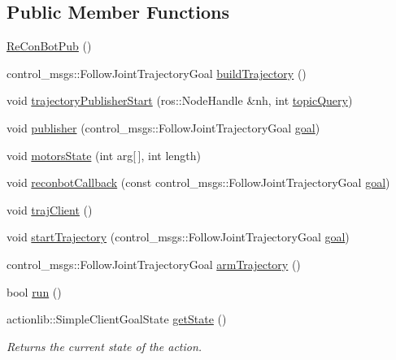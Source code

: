 \subsection*{Public Member Functions}
\begin{DoxyCompactItemize}
\item 
\hyperlink{class_re_con_bot_pub_a3e761c430b2934ad96e499dcd8bd67e2}{Re\+Con\+Bot\+Pub} ()
\item 
control\+\_\+msgs\+::\+Follow\+Joint\+Trajectory\+Goal \hyperlink{class_re_con_bot_pub_af99f5189cd8e834d7b59f1b106b99345}{build\+Trajectory} ()
\item 
void \hyperlink{class_re_con_bot_pub_a2019b0d8d30f2419026c90dd30de500f}{trajectory\+Publisher\+Start} (ros\+::\+Node\+Handle \&nh, int \hyperlink{class_re_con_bot_aba20d307ac1b2e6b22f96da83a0d937d}{topic\+Query})
\item 
void \hyperlink{class_re_con_bot_pub_ac763949cb5256de695e02c5f81084ead}{publisher} (control\+\_\+msgs\+::\+Follow\+Joint\+Trajectory\+Goal \hyperlink{class_re_con_bot_a9bd1c7ddf2376e2e68ea5d8bd8c3f505}{goal})
\item 
void \hyperlink{class_re_con_bot_lx_a0e25f573057755c6729ea572362652e6}{motors\+State} (int arg\mbox{[}$\,$\mbox{]}, int length)
\item 
void \hyperlink{class_re_con_bot_lx_a5d60b16962e5ce8e452f7c53543c54ce}{reconbot\+Callback} (const control\+\_\+msgs\+::\+Follow\+Joint\+Trajectory\+Goal \hyperlink{class_re_con_bot_a9bd1c7ddf2376e2e68ea5d8bd8c3f505}{goal})
\item 
void \hyperlink{class_re_con_bot_ab859fa96532995d3c1545aaa9db1802e}{traj\+Client} ()
\item 
void \hyperlink{class_re_con_bot_ade3eb1a4752d45659321209f5730cef3}{start\+Trajectory} (control\+\_\+msgs\+::\+Follow\+Joint\+Trajectory\+Goal \hyperlink{class_re_con_bot_a9bd1c7ddf2376e2e68ea5d8bd8c3f505}{goal})
\item 
control\+\_\+msgs\+::\+Follow\+Joint\+Trajectory\+Goal \hyperlink{class_re_con_bot_a950f2769ca61ff7b663d86ed2cf19c14}{arm\+Trajectory} ()
\item 
bool \hyperlink{class_re_con_bot_ac264f3082203c3b2ef13b6f353476ca7}{run} ()
\item 
actionlib\+::\+Simple\+Client\+Goal\+State \hyperlink{class_re_con_bot_a3d9656755c06ded1f3b88ce05565f758}{get\+State} ()
\begin{DoxyCompactList}\small\item\em Returns the current state of the action. \end{DoxyCompactList}\end{DoxyCompactItemize}
